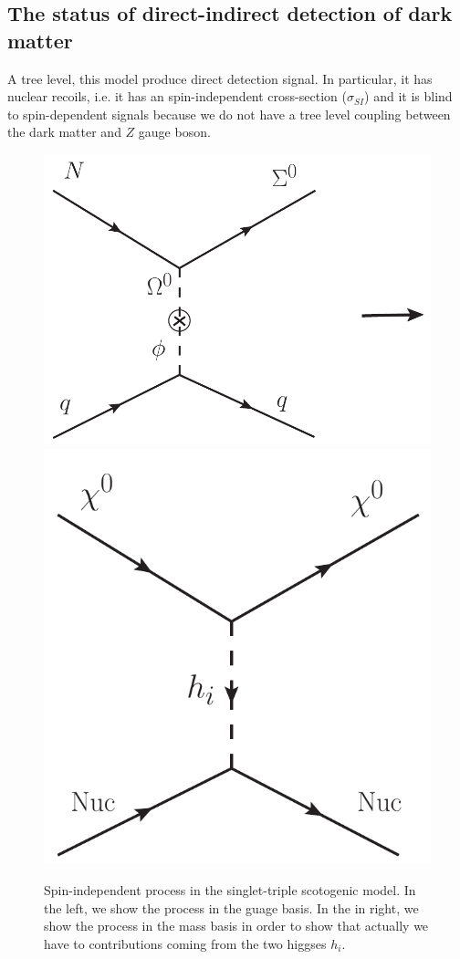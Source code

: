 \documentclass[12pt,letterpaper]{article}
\begin{document}
\subsection{The status of direct-indirect detection of dark matter }
\label{sec:indirect-direct-detection}
A tree level, this model produce direct detection signal. In particular, it has nuclear recoils, i.e. it has an spin-independent cross-section ($\sigma_{SI}$) and it is blind to spin-dependent signals because we do not have a tree level coupling between the dark matter and $Z$ gauge boson. 
%
\begin{figure}
\begin{center}
\includegraphics[scale=0.35]{SI}
\includegraphics[scale=0.35]{SI-mass-basis}
\caption{Spin-independent process in the singlet-triple scotogenic model. In the left, we show the process in the guage basis. In the in right, we show the process in the mass basis in order to show that actually we have to contributions coming from the two higgses $h_i$.}
\label{fig:SI-diagram}
\end{center}
\end{figure}
\end{document}
